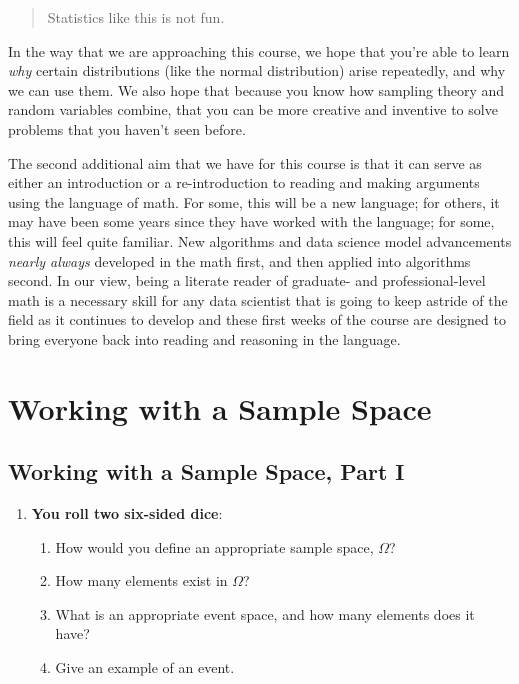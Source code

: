 \documentclass[
]{book}
\providecommand{\tightlist}{%
  \setlength{\itemsep}{0pt}\setlength{\parskip}{0pt}}
\theoremstyle{definition}
\theoremstyle{definition}
\theoremstyle{definition}
\theoremstyle{definition}
\theoremstyle{remark}
\begin{document}
\begin{quote}
Statistics like this is not fun.
\end{quote}

In the way that we are approaching this course, we hope that you're able to learn \emph{why} certain distributions (like the normal distribution) arise repeatedly, and why we can use them. We also hope that because you know how sampling theory and random variables combine, that you can be more creative and inventive to solve problems that you haven't seen before.

The second additional aim that we have for this course is that it can serve as either an introduction or a re-introduction to reading and making arguments using the language of math. For some, this will be a new language; for others, it may have been some years since they have worked with the language; for some, this will feel quite familiar. New algorithms and data science model advancements \emph{nearly always} developed in the math first, and then applied into algorithms second. In our view, being a literate reader of graduate- and professional-level math is a necessary skill for any data scientist that is going to keep astride of the field as it continues to develop and these first weeks of the course are designed to bring everyone back into reading and reasoning in the language.

\hypertarget{working-with-a-sample-space}{%
\section{Working with a Sample Space}\label{working-with-a-sample-space}}

\hypertarget{working-with-a-sample-space-part-i}{%
\subsection{Working with a Sample Space, Part I}\label{working-with-a-sample-space-part-i}}

\begin{enumerate}
\def\labelenumi{\arabic{enumi}.}
\tightlist
\item
  \textbf{You roll two six-sided dice}:

  \begin{enumerate}
  \def\labelenumii{\arabic{enumii}.}
  \tightlist
  \item
    How would you define an appropriate sample space, \(\Omega\)?
  \item
    How many elements exist in \(\Omega\)?
  \item
    What is an appropriate event space, and how many elements does it have?
  \item
    Give an example of an event.
  \end{enumerate}
\end{enumerate}
\end{document}
